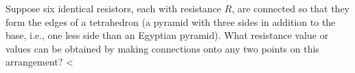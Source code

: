 Suppose six identical resistors, each with resistance
        $R$, are connected so that they form the edges of a
        tetrahedron (a pyramid with three sides in addition to the
        base, i.e., one less side than an Egyptian pyramid). What
        resistance value or values can be obtained by making
        connections onto any two points on this arrangement?
        <%
